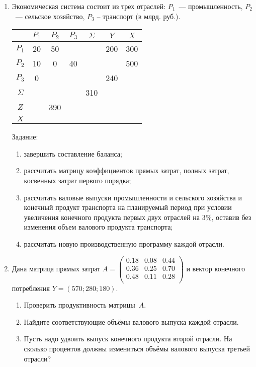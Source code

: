 \documentclass[a5paper,10pt]{extarticle}
\begin{document}
\begin{enumerate}
\item Экономическая система состоит из трех отраслей: 
$P_1$~--- промышленность, 
$P_2$~--- сельское хозяйство, 
$P_3$ – транспорт (в млрд. руб.).

{\centering \begin{tabular}{|c|c|c|c|c|c|c|}
    \hline
    & $P_1$ & $P_2$ & $P_3$ & $\Sigma$ & $Y$ & $X$ \\
    \hline
    $P_1$    & 20    & 50    &       &          & 200 & 300 \\
    \hline
    $P_2$    & 10    & 0     & 40    &          &     & 500 \\
    \hline
    $P_3$    & 0     &       &       &          & 240 &     \\ 
    \hline
    $\Sigma$ &       &       &       &  310     &     &     \\
    \hline
    $Z$      &       & 390   &       &          &     &     \\
    \hline
    $X$      &       &       &       &          &     &     \\
    \hline
\end{tabular}
\par}

Задание:
    \begin{enumerate}
        \item завершить составление баланса;
        \item рассчитать матрицу коэффициентов прямых затрат, полных затрат, косвенных затрат первого порядка;
        \item рассчитать валовые выпуски промышленности и сельского хозяйства и конечный продукт транспорта на планируемый период при условии увеличения конечного продукта первых двух отраслей на 3\%, оставив без изменения объем валового продукта транспорта;
        \item рассчитать новую производственную программу каждой отрасли.
    \end{enumerate}

\item Дана матрица прямых затрат 
$A=\begin{pmatrix}
        0.18 & 0.08 & 0.44\\
        0.36 & 0.25 & 0.70\\
        0.48 & 0.11 & 0.28\\
\end{pmatrix}$
и вектор конечного потребления $Y=(570; 280; 180)$.
\begin{enumerate}
    \item Проверить продуктивность матрицы~$A$.
    \item Найдите соответствующие объёмы валового выпуска каждой отрасли.
    \item Пусть надо удвоить выпуск конечного продукта второй
    отрасли. На сколько процентов должны измениться объёмы валового выпуска третьей отрасли?    
\end{enumerate}


\end{enumerate}
\end{document}
